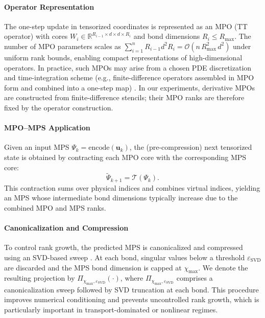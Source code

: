 \documentclass[letterpaper, 10 pt, conference]{ieeeconf}  %
\begin{document}
\paragraph{Operator Representation}
The one-step update in tensorized coordinates is represented as an MPO (TT
operator) with cores
$W_i \in \mathbb{R}^{R_{i-1}\times d\times d\times R_i}$ and bond dimensions
$R_i \le R_{\max}$.
The number of MPO parameters scales as
$\sum_{i=1}^{n} R_{i-1} d^{2} R_i = \mathcal{O}(n\,R_{\max}^{2}\,d^2)$ under
uniform rank bounds, enabling compact representations of high-dimensional
operators. In practice, such MPOs may arise from a chosen PDE discretization and
time-integration scheme (e.g., finite-difference operators assembled in MPO form
and combined into a one-step map) \cite{KazeevKhoromskij2012QTTLaplace,Peddinti2024CFD}. In our experiments, derivative MPOs are constructed from finite-difference stencils; their MPO ranks are therefore fixed by the operator construction. %

\paragraph{MPO--MPS Application}
Given an input MPS $\Psi_k=\mathrm{encode}(\mathbf{u}_k)$, the (pre-compression)
next tensorized state is obtained by contracting each MPO core with the
corresponding MPS core:
\[
\widetilde{\Psi}_{k+1} = \mathcal{T}(\Psi_k).
\]
This contraction sums over physical indices and combines virtual indices,
yielding an MPS whose intermediate bond dimensions typically increase due to the
combined MPO and MPS ranks.

\paragraph{Canonicalization and Compression}
To control rank growth, the predicted MPS is canonicalized and compressed using
an SVD-based sweep \cite{Schollwock2011,Orus2014}. At each bond, singular values
below a threshold $\varepsilon_{\mathrm{SVD}}$ are discarded and the MPS bond
dimension is capped at $\chi_{\max}$. We denote the resulting projection by
$\Pi_{\chi_{\max},\varepsilon_{\mathrm{SVD}}}(\cdot)$, where
$\Pi_{\chi_{\max},\varepsilon_{\mathrm{SVD}}}$ comprises a canonicalization sweep
followed by SVD truncation at each bond. 
This procedure improves numerical conditioning and prevents uncontrolled rank
growth, which is particularly important in transport-dominated or nonlinear
regimes.
\end{document}

